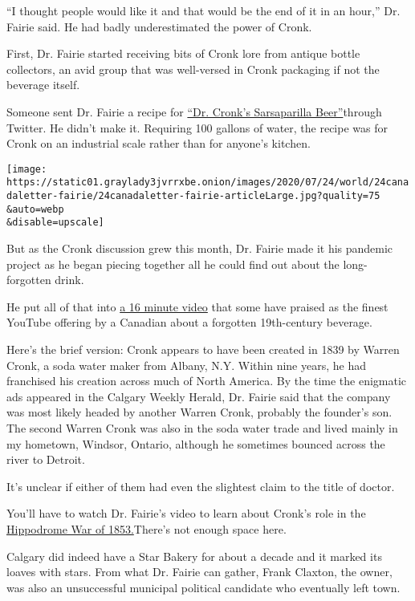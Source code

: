 ``I thought people would like it and that would be the end of it in an
hour,'' Dr. Fairie said. He had badly underestimated the power of Cronk.

First, Dr. Fairie started receiving bits of Cronk lore from antique
bottle collectors, an avid group that was well-versed in Cronk packaging
if not the beverage itself.

Someone sent Dr. Fairie a recipe for
\href{https://twitter.com/JNerissa/status/1275321511646126080?s=20}{``Dr.
Cronk's Sarsaparilla Beer''}through Twitter. He didn't make it.
Requiring 100 gallons of water, the recipe was for Cronk on an
industrial scale rather than for anyone's kitchen.

\texttt{[image: https://static01.graylady3jvrrxbe.onion/images/2020/07/24/world/24canadaletter-fairie/24canadaletter-fairie-articleLarge.jpg?quality=75\\\&auto=webp\\\&disable=upscale]}

But as the Cronk discussion grew this month, Dr. Fairie made it his
pandemic project as he began piecing together all he could find out
about the long-forgotten drink.

He put all of that into \href{https://youtu.be/4anHiXHyPVo}{a 16 minute
video} that some have praised as the finest YouTube offering by a
Canadian about a forgotten 19th-century beverage.

Here's the brief version: Cronk appears to have been created in 1839 by
Warren Cronk, a soda water maker from Albany, N.Y. Within nine years, he
had franchised his creation across much of North America. By the time
the enigmatic ads appeared in the Calgary Weekly Herald, Dr. Fairie said
that the company was most likely headed by another Warren Cronk,
probably the founder's son. The second Warren Cronk was also in the soda
water trade and lived mainly in my hometown, Windsor, Ontario, although
he sometimes bounced across the river to Detroit.

It's unclear if either of them had even the slightest claim to the title
of doctor.

You'll have to watch Dr. Fairie's video to learn about Cronk's role in
the
\href{https://www.neh.gov/humanities/2011/septemberoctober/statement/the-circus-you-never-knew}{Hippodrome
War of 1853.}There's not enough space here.

Calgary did indeed have a Star Bakery for about a decade and it marked
its loaves with stars. From what Dr. Fairie can gather, Frank Claxton,
the owner, was also an unsuccessful municipal political candidate who
eventually left town.

